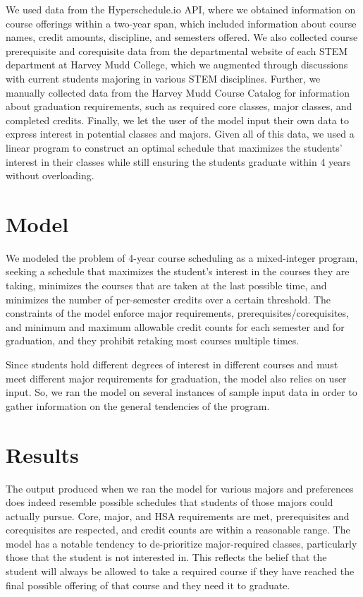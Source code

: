 \documentclass[12pt]{article}
\begin{document}
We used data from the Hyperschedule.io API, where we obtained information on course offerings within a two-year span, which included information about course names, credit amounts, discipline, and semesters offered.
We also collected course prerequisite and corequisite data from the departmental website of each STEM department at Harvey Mudd College, which we augmented through discussions with current students majoring in various STEM disciplines.
Further, we manually collected data from the Harvey Mudd Course Catalog for information about graduation requirements, such as required core classes, major classes, and completed credits.
Finally, we let the user of the model input their own data to express interest in potential classes and majors.
Given all of this data, we used a linear program to construct an optimal schedule that maximizes the students' interest in their classes while still ensuring the students graduate within 4 years without overloading.

\section{Model}

We modeled the problem of 4-year course scheduling as a mixed-integer program, seeking a schedule that maximizes the student's interest in the courses they are taking, minimizes the courses that are taken at the last possible time, and minimizes the number of per-semester credits over a certain threshold. The constraints of the model enforce major requirements, prerequisites/corequisites, and minimum and maximum allowable credit counts for each semester and for graduation, and they prohibit retaking most courses multiple times.

Since students hold different degrees of interest in different courses and must meet different major requirements for graduation, the model also relies on user input. So, we ran the model on several instances of sample input data in order to gather information on the general tendencies of the program. 

\section{Results}

The output produced when we ran the model for various majors and preferences does indeed resemble possible schedules that students of those majors could actually pursue. Core, major, and HSA requirements are met, prerequisites and corequisites are respected, and credit counts are within a reasonable range. The model has a notable tendency to de-prioritize major-required classes, particularly those that the student is not interested in. This reflects the belief that the student will always be allowed to take a required course if they have reached the final possible offering of that course and they need it to graduate.
\end{document}
